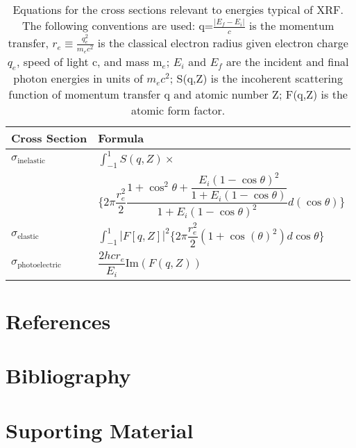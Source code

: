 \documentclass[%
  aip,12pt,tightenlines,
  amsthm,
 amsmath,amssymb,
 reprint,%
]{revtex4-1}
\newcommand{\e}[0]{\\ \hline}
\newcommand{\tLabel}[1]{\label{table:#1}}
\newcommand{\pcaption}[1]{\caption{\noindent#1}}
\newcommand{\pStartF}[0]{ }
\begin{document}
\begin{table}
\begin{ruledtabular}
\begin{tabular}{ l | l  }
  Cross Section &  Formula  \e
  $\sigma_{\text{inelastic}}$ & $\int_{-1}^{1}S(q,Z) \times$ \\ &
  $\{ 2 \pi \dfrac{r_e^2}{2} \dfrac{1+\cos^2{\theta}+\dfrac{E_i (1-\cos\theta)^2}{1+E_i(1-\cos\theta)}}{1+E_i(1-\cos\theta)^2}  d(\cos\theta) \}$ \e
  $\sigma_{\text{elastic}}$ & $ \int_{-1}^{1} |F[q,Z]|^2 \{ 2 \pi \dfrac{r_e^2}{2} (1 + \cos(\theta)^2)  d\cos\theta \}$ \e
  $\sigma_{\text{photoelectric}}$ & $\dfrac{2 h c r_e}{E_i} \text{Im}(F(q,Z))$  
\end{tabular}
\end{ruledtabular}
\pcaption{\tLabel{Scattering}\pStartF Equations for the cross sections relevant to energies typical of XRF. The following conventions are used: q=$\frac{|E_f-E_i|}{c}$ is the momentum transfer, $r_e\equiv\frac{q_e^2}{m_e c^2}$ is the classical electron radius given electron charge $q_e$, speed of light c, and mass m$_e$; $E_i$ and $E_f$ are the incident and final photon energies in units of $m_e c^2$; S(q,Z) is the incoherent scattering function of momentum transfer q and atomic number Z;\cite{hubbell_pair_1980} F(q,Z) is the atomic form factor.\cite{waasmaier_new_1995,hubbell_atomic_1975}}
\end{table}



\section{References}


\section{Bibliography}



 

\section{Suporting Material}
\end{document}
